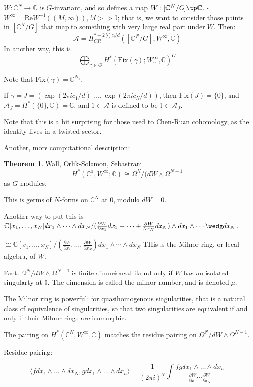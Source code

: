 \documentclass{amsart}
\theoremstyle{definition}
\newtheorem{theorem}[dummy]{Theorem}
\newcommand{\C}{\mathbb{C}}
\newcommand{\Fix}{\text{Fix}}
\newcommand{\one}{1}
\begin{document}
$W:\C^N\to\C$ is $G$-invariant, and so defines a map
$W:[\C^N/G]\tp\C$.
-
$W^\infty=\text{Re}W^{-1}\left((M,\infty)\right), M>>0$;
that is, we want to consider those points in $[\C^N/G]$ that map to something with very large real part under $W$.
Then:
$$\mathcal{A}=H_{CR}^{*+2\sum c_i/d} ([\C^N/G],W^\infty,\C)$$
In another way, this is 
$$\bigoplus_{\gamma\in G} H^*(\Fix(\gamma);W_\gamma^\infty,\C)^G$$

Note that $\Fix(\gamma)=\C^{N_\gamma}$.

If $\gamma=J=(\exp(2\pi i c_1/d),\dots,\exp(2\pi i c_N/d))$, then $\Fix(J)=\{0\}$, and $\mathcal{A}_J=H^*(\{0\},\C)=\C$, and $\one\in\mathcal{A}$ is defined to be $1\in\mathcal{A}_J$.

Note that this is a bit surprising for those used to Chen-Ruan cohomology, as the identity lives in a twisted sector.

Another, more computational description:

\begin{theorem}{Wall, Orlik-Solomon, Sebastrani}
$$H^*(\C^n, W^\infty;\C)\cong\Omega^N/(dW\wedge\Omega^{N-1}$$ as $G$-modules.
\end{theorem}

This is germs of $N$-forms on $\C^N$ at 0, modulo $dW=0$.

Another way to put this is $\C[x_1,\dots,x_N]dx_1\wedge\cdots\wedge dx_N/(\frac{\partial W}{\partial x_1}dx_1+\cdots+\frac{\partial W}{\partial x_N}dx_N)\wedge dx_1\wedge\cdots\wedg dx_N$.

$\cong \C[x_1,\dots,x_N]/(\frac{\partial W}{\partial x_1},\dots, \frac{\partial W}{\partial x_N})dx_1\wedge\cdots\wedge dx_N$
THis is the Milnor ring, or local algebra, of $W$.  

Fact: $\Omega^N/dW\wedge\Omega^{N-1}$ is finite dimneionsal ifa nd only if $W$ has an isolated singularty at 0.  The dimension is called the milnor number, and is denoted $\mu$.  

The Milnor ring is powerful: for quasihomogenous singularities, that is a natural class of equivalence of singularities, so that two singularities are equivalent if and only if their Milnor rings are isomorphic.


The pairing on $H^*(\C^N, W^\infty,\C)$ matches the residue pairing on $\Omega^N/dW\wedge\Omega^{N-1}$.  

Residue pairing:

$$\langle fdx_1\wedge\dots\wedge dx_N,gdx_1\wedge\dots\wedge dx_n\rangle=
\frac{1}{(2\pi i)^N}\int \frac{fg dx_1\wedge\dots\wedge dx_n}{\frac{\partial W}{\partial x_1}\cdots\frac{\partial W}{\partial x_N}}$$
\end{document}
